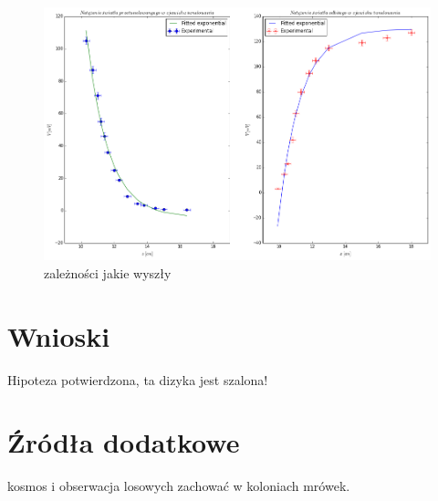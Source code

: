 \documentclass[a4paper,12pt]{article}
\begin{document}
\begin{figure} [H]
  \begin{center}
    \includegraphics[width = 15cm]{beautiful_plot.png}
    \caption{zależności jakie wyszły}
  \end{center}
\end{figure}

\section{Wnioski}

Hipoteza potwierdzona, ta dizyka jest szalona! 

\section {Źródła dodatkowe}
  
 kosmos i obserwacja losowych zachować w koloniach mrówek. 
\end{document}
